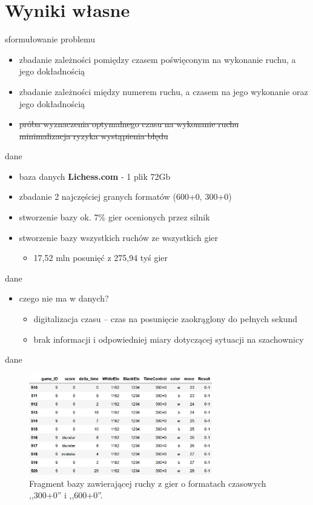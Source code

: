 \documentclass{beamer}
\begin{document}
\section{Wyniki własne}

\begin{frame}{sformułowanie problemu}
	\begin{itemize}
		\item zbadanie zależności pomiędzy czasem poświęconym na wykonanie ruchu, a jego dokładnością
		\item zbadanie zależności między numerem ruchu, a czasem na jego wykonanie oraz jego dokładnością
		\item \sout{próba wyznaczenia optymalnego czasu na wykonanie ruchu\\ minimalizacja ryzyka wystąpienia błędu} 
	\end{itemize}
\end{frame}

\begin{frame}{dane}
	\begin{itemize}
		\item baza danych \textbf{Lichess.com} - 1 plik 72Gb
		\item zbadanie 2 najczęściej granych formatów (600+0, 300+0)
		\item stworzenie bazy ok. 7\% gier ocenionych przez silnik
		\item stworzenie bazy wszystkich ruchów ze wszystkich gier
		\begin{itemize}
			\item 17,52 mln posunięć z 275,94 tyś gier
		\end{itemize}
	\end{itemize}
\end{frame}
\begin{frame}{dane}
		\begin{itemize}
	\item czego nie ma w danych?
		\begin{itemize}
		\item digitalizacja czasu -- czas na posunięcie zaokrąglony do pełnych sekund
		\item brak informacji i odpowiedniej miary dotyczącej sytuacji na szachownicy
	\end{itemize}
	\end{itemize}
\end{frame}


\begin{frame}{dane}
\begin{figure}[H]
	\centering
	\includegraphics[width=8cm]{../Formatka/danee.png}
	\caption{Fragment bazy zawierającej ruchy z gier o formatach czasowych ,,300+0'' i ,,600+0''.}
	\label{rys:baza_ruchow}
\end{figure}
\end{frame}
\end{document}
